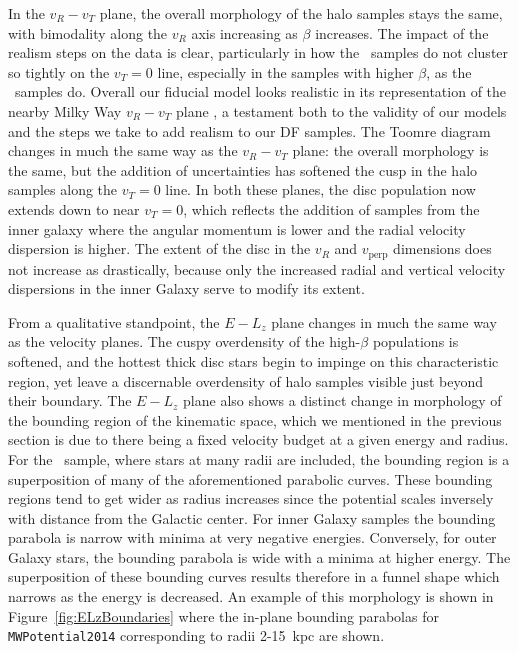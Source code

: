 In the $v_{R}-v_{T}$ plane, the overall morphology of the halo samples stays the same, with bimodality along the $v_{R}$ axis increasing as $\beta$ increases. The impact of the realism steps on the data is clear, particularly in how the \survey\ samples do not cluster so tightly on the $v_{T}=0$ line, especially in the samples with higher $\beta$, as the \solar\ samples do. Overall our fiducial model looks realistic in its representation of the nearby Milky Way $v_{R}-v_{T}$ plane \citep[c.f. figures 2 and 1 in ][ respectively, although note they use spherical coordinates]{belokurov18,fattahi19}, a testament both to the validity of our models and the steps we take to add realism to our DF samples. The Toomre diagram changes in much the same way as the $v_{R}-v_{T}$ plane: the overall morphology is the same, but the addition of uncertainties has softened the cusp in the halo samples along the $v_{T}=0$ line. In both these planes, the disc population now extends down to near $v_{T}=0$, which reflects the addition of samples from the inner galaxy where the angular momentum is lower and the radial velocity dispersion is higher. The extent of the disc in the $v_{R}$ and $v_\mathrm{perp}$ dimensions does not increase as drastically, because only the increased radial and vertical velocity dispersions in the inner Galaxy serve to modify its extent.

From a qualitative standpoint, the $E-L_{z}$ plane changes in much the same way as the velocity planes. The cuspy overdensity of the high-$\beta$ populations is softened, and the hottest thick disc stars begin to impinge on this characteristic region, yet leave a discernable overdensity of halo samples visible just beyond their boundary. The $E-L_{z}$ plane also shows a distinct change in morphology of the bounding region of the kinematic space, which we mentioned in the previous section is due to there being a fixed velocity budget at a given energy and radius. For the \survey\ sample, where stars at many radii are included, the bounding region is a superposition of many of the aforementioned parabolic curves. These bounding regions tend to get wider as radius increases since the potential scales inversely with distance from the Galactic center. For inner Galaxy samples the bounding parabola is narrow with minima at very negative energies. Conversely, for outer Galaxy stars, the bounding parabola is wide with a minima at higher energy. The superposition of these bounding curves results therefore in a funnel shape which narrows as the energy is decreased. An example of this morphology is shown in Figure~\ref{fig:ELzBoundaries} where the in-plane bounding parabolas for \texttt{MWPotential2014} corresponding to radii 2-15~kpc are shown.

